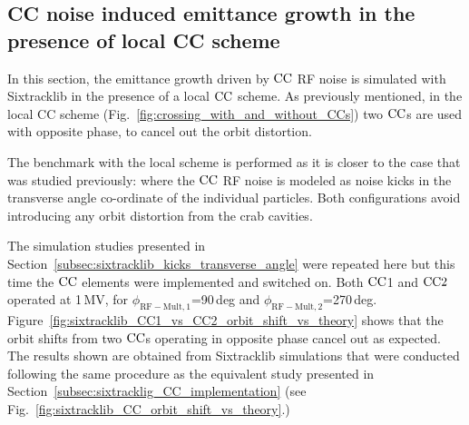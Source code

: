 \subsection{CC noise induced emittance growth in the presence of local CC scheme}\label{subsec:local_CC_sixtracklib}


In this section, the emittance growth driven by ${\mathrm{CC}}$ RF noise is simulated with Sixtracklib in the presence of a local ${\mathrm{CC}}$ scheme. As previously mentioned, in the local CC scheme (Fig.~\ref{fig:crossing_with_and_without_CCs}) two ${\mathrm{CC}}$s are used with opposite phase, to cancel out the orbit distortion.


The benchmark with the local scheme is performed as it is closer to the case that was studied previously: where the ${\mathrm{CC}}$ RF noise is modeled as noise kicks in the transverse angle co-ordinate of the individual particles. Both configurations avoid introducing any orbit distortion from the crab cavities.

The simulation studies presented in Section~\ref{subsec:sixtracklib_kicks_transverse_angle} were repeated here but this time the ${\mathrm{CC}}$ elements were implemented and switched on. Both ${\mathrm{CC}}$1 and ${\mathrm{CC}}2$ operated at 1\,MV, for $\phi_\mathrm{RF-Mult, 1}$=90\,deg and  $\phi_\mathrm{RF-Mult, 2}$=270\,deg. Figure~\ref{fig:sixtracklib_CC1_vs_CC2_orbit_shift_vs_theory} shows that the orbit shifts from two ${\mathrm{CC}}$s operating in opposite phase cancel out as expected. The results shown are obtained from Sixtracklib simulations that were conducted following the same procedure as the equivalent study presented in Section~\ref{subsec:sixtracklig_CC_implementation} (see Fig.~\ref{fig:sixtracklib_CC_orbit_shift_vs_theory}.)

